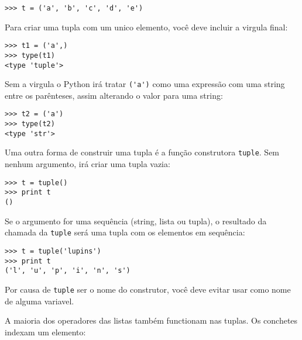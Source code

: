 
\beforeverb
\begin{verbatim}
>>> t = ('a', 'b', 'c', 'd', 'e')
\end{verbatim}
\afterverb
%
Para criar uma tupla com um unico elemento, você deve incluir a virgula
final:


\beforeverb
\begin{verbatim}
>>> t1 = ('a',)
>>> type(t1)
<type 'tuple'>
\end{verbatim}
\afterverb
%
Sem a virgula o Python irá tratar \verb"('a')" como uma expressão
com uma string entre os parênteses, assim alterando o valor para uma string:

\beforeverb
\begin{verbatim}
>>> t2 = ('a')
>>> type(t2)
<type 'str'>
\end{verbatim}
\afterverb
%
Uma outra forma de construir uma tupla é a função construtora {\tt tuple}.
Sem nenhum argumento, irá criar uma tupla vazia:


\beforeverb
\begin{verbatim}
>>> t = tuple()
>>> print t
()
\end{verbatim}
\afterverb
%
Se o argumento for uma sequência (string, lista ou tupla), o resultado
da chamada da {\tt tuple} será uma tupla com os elementos em sequência:

\beforeverb
\begin{verbatim}
>>> t = tuple('lupins')
>>> print t
('l', 'u', 'p', 'i', 'n', 's')
\end{verbatim}
\afterverb
%
Por causa de {\tt tuple} ser o nome do construtor, você deve
evitar usar como nome de alguma variavel.

A maioria dos operadores das listas também functionam nas tuplas.
Os conchetes indexam um elemento:

